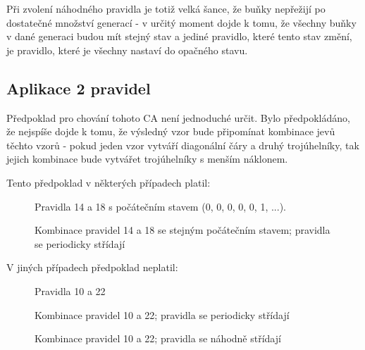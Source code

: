 Při zvolení náhodného pravidla je totiž velká šance, že buňky nepřežijí po
dostatečné množství generací - v určitý moment dojde k tomu, že všechny buňky v
dané generaci budou mít stejný stav a jediné pravidlo, které tento stav změní,
je pravidlo, které je všechny nastaví do opačného stavu.

\newpage
\subsection{Aplikace 2 pravidel}
Předpoklad pro chování tohoto CA není jednoduché určit.
Bylo předpokládáno, že nejspíše dojde k tomu, že výsledný vzor
bude připomínat kombinace jevů těchto vzorů
- pokud jeden vzor vytváří diagonální čáry a druhý trojúhelníky,
tak jejich kombinace bude vytvářet trojúhelníky s menším náklonem.

Tento předpoklad v některých případech platil:
\begin{figure}[h]
	\centering
	\hspace{3em}
	\caption{Pravidla 14 a 18 s počátečním stavem (0, 0, 0, 0, 0, 1, ...).}
\end{figure}

\begin{figure}[h]
	\centering
	\caption{Kombinace pravidel 14 a 18 se stejným počátečním stavem;
	pravidla se periodicky střídají}
\end{figure}


\newpage
V jiných případech předpoklad neplatil:
\begin{figure}[h]
	\centering
	\hspace{3em}
	\caption{Pravidla 10 a 22}
\end{figure}

\begin{figure}[h]
	\centering
	\caption{Kombinace pravidel 10 a 22; pravidla se periodicky střídají}
\end{figure}

\begin{figure}[h]
	\centering
	\caption{Kombinace pravidel 10 a 22; pravidla se náhodně střídají}
\end{figure}

